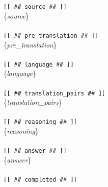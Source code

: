 \documentclass[11pt]{article}
\theoremstyle{plain}
\theoremstyle{definition}
\theoremstyle{remark}
\begin{document}
\begin{figure}[H]
{\begin{tcolorbox}[colback=orange!10, colframe=orange!70, coltitle=black,title=System Prompt]
\texttt{[[ \#\# source \#\# ]]} \\ \{\textit{source}\} \\ \\
\texttt{[[ \#\# pre\_translation \#\# ]]} \\ \{\textit{pre\_translation}\} \\ \\
\texttt{[[ \#\# language \#\# ]]} \\ \{\textit{language}\} \\ \\
\texttt{[[ \#\# translation\_pairs \#\# ]]} \\ \{\textit{translation\_pairs}\} \\ \\
\texttt{[[ \#\# reasoning \#\# ]]} \\ \{\textit{reasoning}\} \\ \\
\texttt{[[ \#\# answer \#\# ]]} \\ \{\textit{answer}\} \\ \\ 
\texttt{[[ \#\# completed \#\# ]]} \\


\end{tcolorbox}}
\end{figure}
\end{document}
